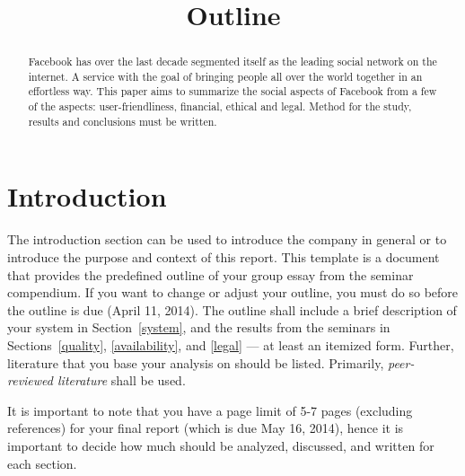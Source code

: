 \documentclass[conference]{IEEEtran}
\begin{document}
\title{Outline}


\author{
\and
{}
}


\maketitle


\begin{abstract}
Facebook has over the last decade segmented itself as the leading social
network on the internet.
A service with the goal of bringing people all over the world together in an
effortless way. This paper aims to summarize the social aspects of Facebook
from a few of the aspects: user-friendliness, financial, ethical and legal. 
Method for the study, results and conclusions must be written. 
\end{abstract}

\section{Introduction}
The introduction section can be used to introduce the company in general or to
introduce the purpose and context of this report. This template is a document
that provides the predefined outline of your group essay from the seminar
compendium. If you want to change or adjust your outline, you must do so before
the outline is due (April 11, 2014). The outline shall include a brief
description of your system in Section~\ref{system}, and the results from the
seminars in Sections~\ref{quality}, \ref{availability}, and \ref{legal} --- at
least an itemized form. Further, literature that you base your analysis on
should be listed. Primarily, \emph{peer-reviewed literature} shall be used.

It is important to note that you have a page limit of 5-7 pages (excluding references) for your final report (which is due May 16, 2014), hence it is important to decide how much should be analyzed, discussed, and written for each section.
\end{document}
